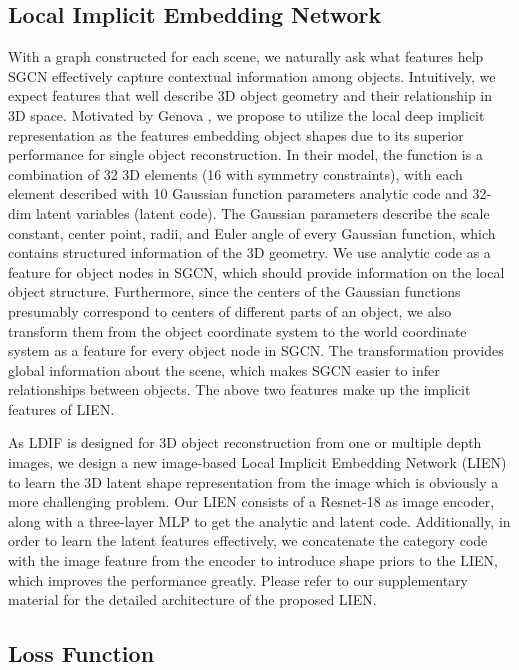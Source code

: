 \documentclass[final]{cvpr}
\begin{document}
\subsection{Local Implicit Embedding Network}
\label{sec:lien}
With a graph constructed for each scene, we naturally ask what features help SGCN effectively capture contextual information among objects. 
Intuitively, we expect features that well describe 3D object geometry and their relationship in 3D space. 
Motivated by Genova \etal \cite{genova2020local}, we propose to utilize the local deep implicit representation as the features embedding object shapes due to its superior performance for single object reconstruction.
In their model, 
the function is a combination of 32 3D elements (16 with symmetry constraints), with each element described with 10 Gaussian function parameters analytic code and 32-dim latent variables (latent code). The Gaussian parameters describe the scale constant, center point, radii, and Euler angle of every Gaussian function, which contains structured information of the 3D geometry.
We use analytic code as a feature for object nodes in SGCN, which should provide information on the local object structure.
Furthermore, since the centers of the Gaussian functions presumably correspond to centers of different parts of an object, we also transform them from the object coordinate system to the world coordinate system as a feature for every object node in SGCN.
The transformation provides global information about the scene, which makes SGCN easier to infer relationships between objects.
The above two features make up the implicit features of LIEN.

As LDIF \cite{genova2020local} is designed for 3D object reconstruction from one or multiple depth images, we design a new image-based Local Implicit Embedding Network (LIEN) to learn the 3D latent shape representation from the image which is obviously a more challenging problem.
Our LIEN consists of a Resnet-18 as image encoder, along with a three-layer MLP to get the analytic and latent code. 
Additionally, in order to learn the latent features effectively, we concatenate the category code with the image feature from the encoder to introduce shape priors to the LIEN, which improves the performance greatly. Please refer to our supplementary material for the detailed architecture of the proposed LIEN. 

\subsection{Loss Function}
\end{document}
